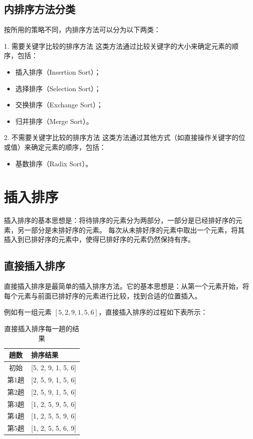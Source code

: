 \documentclass[lang=cn,newtx,10pt,scheme=chinese]{../elegantbook}
\begin{document}
\subsection{内排序方法分类}

按所用的策略不同，内排序方法可以分为以下两类：

1. 需要关键字比较的排序方法  
   这类方法通过比较关键字的大小来确定元素的顺序，包括：
   \begin{itemize}
     \item 插入排序（Insertion Sort）；
     \item 选择排序（Selection Sort）；
     \item 交换排序（Exchange Sort）；
     \item 归并排序（Merge Sort）。
   \end{itemize}

2. 不需要关键字比较的排序方法  
   这类方法通过其他方式（如直接操作关键字的位或值）来确定元素的顺序，包括：
   \begin{itemize}
     \item 基数排序（Radix Sort）。
   \end{itemize}
\section{插入排序}
插入排序的基本思想是：将待排序的元素分为两部分，一部分是已经排好序的元素，另一部分是未排好序的元素。
每次从未排好序的元素中取出一个元素，将其插入到已排好序的元素中，使得已排好序的元素仍然保持有序。
\subsection{直接插入排序}

直接插入排序是最简单的插入排序方法。它的基本思想是：从第一个元素开始，将每个元素与前面已排好序的元素进行比较，找到合适的位置插入。

例如有一组元素 $[5, 2, 9, 1, 5, 6]$，直接插入排序的过程如下表所示：

\begin{table}[!htbp]
\centering
\caption{直接插入排序每一趟的结果}
\label{tab:directInsertionSort}
\begin{tabular}{|c|l|}
\hline
\textbf{趟数} & \textbf{排序结果} \\ \hline
初始 & [5, 2, 9, 1, 5, 6] \\ \hline
第1趟 & [2, 5, 9, 1, 5, 6] \\ \hline
第2趟 & [2, 5, 9, 1, 5, 6] \\ \hline
第3趟 & [1, 2, 5, 9, 5, 6] \\ \hline
第4趟 & [1, 2, 5, 5, 9, 6] \\ \hline
第5趟 & [1, 2, 5, 5, 6, 9] \\ \hline
\end{tabular}
\end{table}
\end{document}
